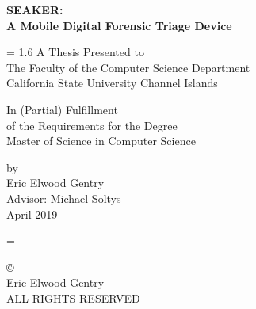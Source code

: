 \documentclass[12pt]{article}
\newcommand{\A}{\mathcal{A}}
\begin{document}
\begin{titlepage}
\begin{center}
{\Large \bfseries SEAKER:\protect\\A Mobile Digital Forensic Triage Device \par}

\vspace{2 cm}
\baselineskip = 1.6\baselineskip
A Thesis Presented to \\
The Faculty of the Computer Science Department\\
California State University Channel Islands

\vspace{1 cm}

In (Partial) Fulfillment\\
of the Requirements for the Degree\\
Master of Science in Computer Science\\

\vspace{1 cm}

by \\
Eric Elwood Gentry\\
Advisor: Michael Soltys\\
April 2019
\end{center}
\end{titlepage}
\baselineskip = \baselineskip

\newpage
\null
\vfill
\begin{flushleft}
\copyright{}\\
Eric Elwood Gentry\\
ALL RIGHTS RESERVED
\end{flushleft}
\newpage
\end{document}
